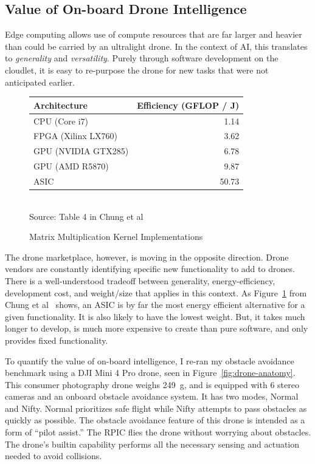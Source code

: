 \subsection{Value of On-board Drone Intelligence}
\label{sec:djiminipro}

Edge computing allows use of compute resources that are far larger and heavier than could be carried by an ultralight drone.  In the context of AI,
this translates to {\em generality} and {\em versatility}.  Purely
through software development on the cloudlet, it is easy to re-purpose
the drone for new tasks that were not anticipated earlier.

\begin{figure}
\small
\centering
\begin{tabular}{lr}
  \hline
  Architecture & Efficiency (GFLOP / J) \\
  \hline
  CPU (Core i7)        & \phantom{0}1.14  \\
  FPGA (Xilinx LX760)  & \phantom{0}3.62  \\
  GPU (NVIDIA GTX285)  & \phantom{0}6.78  \\
  GPU (AMD R5870)      & \phantom{0}9.87  \\
  ASIC                 & 50.73 \\
  \hline
\end{tabular}
\begin{captext}
\\[0.2cm] \small Source: Table 4 in Chung et al~\cite{Chung2010}
\end{captext}
\caption{Matrix Multiplication Kernel Implementations}
\label{fig:energy2}
\end{figure}

The drone marketplace, however, is moving in the opposite direction.
Drone vendors are constantly identifying specific new functionality to
add to drones. There is a well-understood tradeoff between
generality, energy-efficiency, development cost, and weight/size that
applies in this context. As Figure~\ref{fig:energy2} from Chung et
al~\cite{Chung2010} shows, an ASIC is by far the most energy efficient
alternative for a given functionality.  It is also likely to have the
lowest weight.  But, it takes much longer to develop, is much more
expensive to create than pure software, and only provides fixed
functionality.

To quantify the value of on-board intelligence, I re-ran my obstacle
avoidance benchmark using a DJI Mini 4 Pro drone, seen in Figure~\ref{fig:drone-anatomy}.  This consumer
photography drone weighs 249~g, and is equipped with 6 stereo cameras
and an onboard obstacle avoidance system. It has two modes, Normal and
Nifty. Normal prioritizes safe flight while Nifty attempts to pass
obstacles as quickly as possible.  The obstacle avoidance feature of
this drone is intended as a form of ``pilot assist.''  The RPIC flies
the drone without worrying about obstacles.  The drone's builtin
capability performs all the necessary sensing and actuation needed to
avoid collisions.

